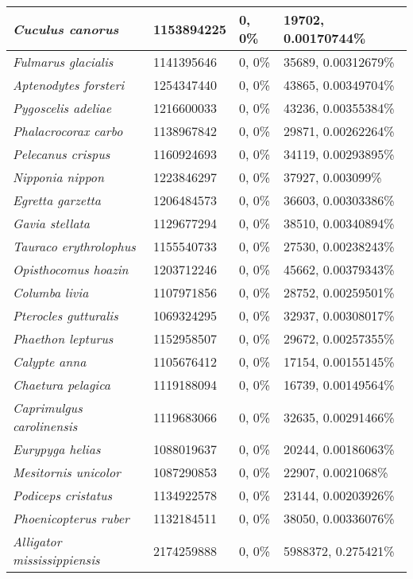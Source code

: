 {\begin{longtable}{| L{4cm} | L{2.7cm}  | L{3.7cm} | L{3.7cm} |}
\textit{Cuculus canorus} & 1153894225 & 0, 0\% & 19702, 0.00170744\% \\ \hline
\textit{Fulmarus glacialis} & 1141395646 & 0, 0\% & 35689, 0.00312679\% \\ \hline
\textit{Aptenodytes forsteri} & 1254347440 & 0, 0\% & 43865, 0.00349704\% \\ \hline
\textit{Pygoscelis adeliae} & 1216600033 & 0, 0\% & 43236, 0.00355384\% \\ \hline
\textit{Phalacrocorax carbo} & 1138967842 & 0, 0\% & 29871, 0.00262264\% \\ \hline
\textit{Pelecanus crispus} & 1160924693 & 0, 0\% & 34119, 0.00293895\% \\ \hline
\textit{Nipponia nippon} & 1223846297 & 0, 0\% & 37927, 0.003099\% \\ \hline
\textit{Egretta garzetta} & 1206484573 & 0, 0\% & 36603, 0.00303386\% \\ \hline
\textit{Gavia stellata} & 1129677294 & 0, 0\% & 38510, 0.00340894\% \\ \hline
\textit{Tauraco erythrolophus} & 1155540733 & 0, 0\% & 27530, 0.00238243\% \\ \hline
\textit{Opisthocomus hoazin} & 1203712246 & 0, 0\% & 45662, 0.00379343\% \\ \hline
\textit{Columba livia} & 1107971856 & 0, 0\% & 28752, 0.00259501\% \\ \hline
\textit{Pterocles gutturalis} & 1069324295 & 0, 0\% & 32937, 0.00308017\% \\ \hline
\textit{Phaethon lepturus} & 1152958507 & 0, 0\% & 29672, 0.00257355\% \\ \hline
\textit{Calypte anna} & 1105676412 & 0, 0\% & 17154, 0.00155145\% \\ \hline
\textit{Chaetura pelagica} & 1119188094 & 0, 0\% & 16739, 0.00149564\% \\ \hline
\textit{Caprimulgus carolinensis} & 1119683066 & 0, 0\% & 32635, 0.00291466\% \\ \hline
\textit{Eurypyga helias} & 1088019637 & 0, 0\% & 20244, 0.00186063\% \\ \hline
\textit{Mesitornis unicolor} & 1087290853 & 0, 0\% & 22907, 0.0021068\% \\ \hline
\textit{Podiceps cristatus} & 1134922578 & 0, 0\% & 23144, 0.00203926\% \\ \hline
\textit{Phoenicopterus ruber} & 1132184511 & 0, 0\% & 38050, 0.00336076\% \\ \hline
\textit{Alligator mississippiensis} & 2174259888 & 0, 0\% & 5988372, 0.275421\% \\ \hline

\end{longtable}}
